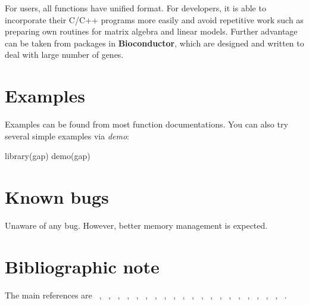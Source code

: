 \documentclass[11pt,a4paper]{article}
\begin{document}
For users, all functions have unified format. For developers, it is able to incorporate
their C/C++ programs more easily and avoid repetitive work such as preparing own routines
for matrix algebra and linear models. Further advantage can be taken from packages in
{\bf Bioconductor}, which are designed and written to deal with large number of genes.


\section{Examples}

Examples can be found from most function documentations. You can also try several simple
examples via \textit{demo}:

\begin{Schunk}
\begin{Scode}
library(gap)
demo(gap)
\end{Scode}
\end{Schunk}

\section{Known bugs}

Unaware of any bug. However, better memory management is expected.

\section{Bibliographic note}

The main references are ~\cite{chow60}, ~\cite{guo92}, ~\cite{wcn92}, ~\cite{gholamic94},
~\cite{risch96}, ~\cite{spielman96}, ~\cite{risch97}, ~\cite{miller97}, ~\cite{sham97}, 
~\cite{sham98}, ~\cite{devlin99}, ~\cite{zhao99}, ~\cite{guo00}, ~\cite{hirotsu01}, 
~\cite{zhao02}, ~\cite{zaykin02}, ~\cite{zhao04}, ~\cite{wacholder04}, ~\cite{wang05},
~\cite{skol06}, ~\cite{wakefield07}.


\end{document}
